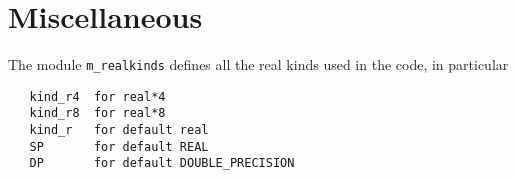 \section{Miscellaneous}
%
The module {\tt m\_realkinds} defines all the real kinds used in the code, 
in particular
%
\begin{verbatim}
   kind_r4  for real*4
   kind_r8  for real*8
   kind_r   for default real
   SP       for default REAL
   DP       for default DOUBLE_PRECISION
\end{verbatim}
% 
